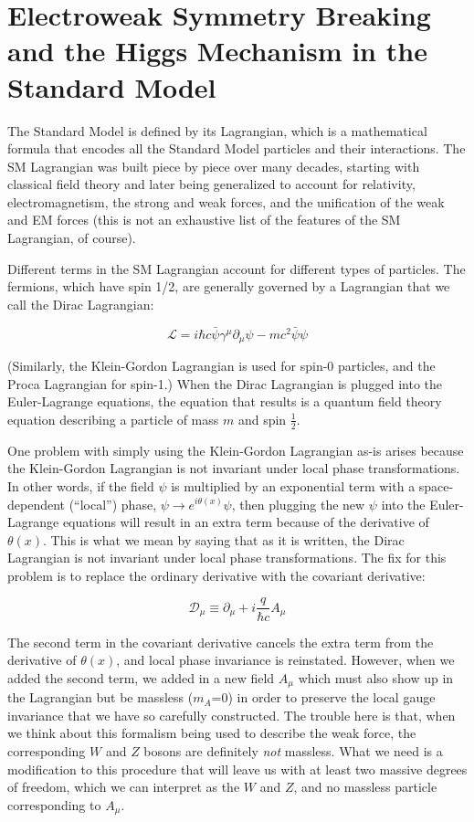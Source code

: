 \section{Electroweak Symmetry Breaking and the Higgs Mechanism in the Standard Model}
The Standard Model is defined by its Lagrangian, which is a mathematical formula that encodes all the Standard Model particles and their interactions.  The SM Lagrangian was built piece by piece over many decades, starting with classical field theory and later being generalized to account for relativity, electromagnetism, the strong and weak forces, and the unification of the weak and EM forces (this is not an exhaustive list of the features of the SM Lagrangian, of course).  

Different terms in the SM Lagrangian account for different types of particles.  The fermions, which have spin 1/2, are generally governed by a Lagrangian that we call the Dirac Lagrangian:

\begin{equation}
\mathscr{L}= i\hbar c \bar{\psi} \gamma^\mu \partial_\mu \psi -mc^2 \bar{\psi}\psi
\end{equation}

(Similarly, the Klein-Gordon Lagrangian is used for spin-0 particles, and the Proca Lagrangian for spin-1.)  When the Dirac Lagrangian is plugged into the Euler-Lagrange equations, the equation that results is a quantum field theory equation describing a particle of mass $m$ and spin $\frac{1}{2}$.  

One problem with simply using the Klein-Gordon Lagrangian as-is arises because the Klein-Gordon Lagrangian is not invariant under local phase transformations.  In other words, if the field $\psi$ is multiplied by an exponential term with a space-dependent (``local'') phase, $\psi \rightarrow e^{i\theta(x)} \psi$, then plugging the new $\psi$ into the Euler-Lagrange equations will result in an extra term because of the derivative of $\theta(x)$.  This is what we mean by saying that as it is written, the Dirac Lagrangian is not invariant under local phase transformations.  The fix for this problem is to replace the ordinary derivative with the covariant derivative:

\begin{equation}
\mathscr{D}_\mu \equiv \partial_\mu + i\frac{q}{\hbar c}A_\mu
\end{equation}

The second term in the covariant derivative cancels the extra term from the derivative of $\theta(x)$, and local phase invariance is reinstated.  However, when we added the second term, we added in a new field $A_\mu$ which must also show up in the Lagrangian but be massless ($m_A$=0) in order to preserve the local gauge invariance that we have so carefully constructed.  The trouble here is that, when we think about this formalism being used to describe the weak force, the corresponding $W$ and $Z$ bosons are definitely \textit{not} massless.  What we need is a modification to this procedure that will leave us with at least two massive degrees of freedom, which we can interpret as the $W$ and $Z$, and no massless particle corresponding to $A_\mu$.

